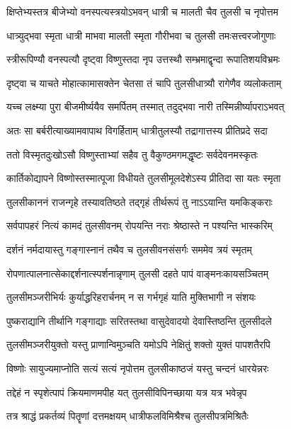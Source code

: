 
\twolineshloka
{क्षिप्तेभ्यस्तत्र बीजेभ्यो वनस्पत्यस्त्रयोऽभवन्}
{धात्री च मालती चैव तुलसी च नृपोत्तम} %

\twolineshloka
{धात्र्युद्भवा स्मृता धात्री माभवा मालती स्मृता}
{गौरीभवा च तुलसी तमःसत्त्वरजोगुणाः} %

\twolineshloka
{स्त्रीरूपिण्यौ वनस्पत्यौ दृष्ट्वा विष्णुस्तदा नृप}
{उत्तस्थौ सम्भ्रमाद्वृन्दा रूपातिशयविभ्रमः} %

\twolineshloka
{दृष्ट्वा च याचते मोहात्कामासक्तेन चेतसा}
{तं चापि तुलसीधात्र्यौ रागेणैव व्यलोकताम्} %

\twolineshloka
{यच्च लक्ष्म्या पुरा बीजमीर्ष्ययैव समर्पितम्}
{तस्मात् तदुद्भवा नारी तस्मिन्नीर्ष्यापराऽभवत्} %

\twolineshloka
{अतः सा बर्बरीत्याख्यामवापाथ विगर्हिताम्}
{धात्रीतुलस्यौ तद्रागात्तस्य प्रीतिप्रदे सदा} %

\twolineshloka
{ततो विस्मृतदुःखोऽसौ विष्णुस्ताभ्यां सहैव तु}
{वैकुण्ठमगमद्धृष्टः सर्वदेवनमस्कृतः} %

\twolineshloka
{कार्तिकोद्यापने विष्णोस्तस्मात्पूजा विधीयते}
{तुलसीमूलदेशेऽस्य प्रीतिदा सा यतः स्मृता} %

\twolineshloka
{तुलसीकाननं राजन्गृहे तस्यावतिष्ठते}
{तद्गृहं तीर्थरूपं तु नाऽऽयान्ति यमकिङ्कराः} %

\twolineshloka
{सर्वपापहरं नित्यं कामदं तुलसीवनम्}
{रोपयन्ति नराः श्रेष्ठास्ते न पश्यन्ति भास्करिम्} %

\twolineshloka
{दर्शनं नर्मदायास्तु गङ्गास्नानं तथैव च}
{तुलसीवनसंसर्गः सममेव त्रयं स्मृतम्} %

\twolineshloka
{रोपणात्पालनात्सेकाद्दर्शनात्स्पर्शनान्नृणाम्}
{तुलसी दहते पापं वाङ्मनःकायसञ्चितम्} %

\twolineshloka
{तुलसीमञ्जरीभिर्यः कुर्याद्धरिहरार्चनम्}
{न स गर्भगृहं याति मुक्तिभागी न संशयः} %

\twolineshloka
{पुष्कराद्यानि तीर्थानि गङ्गाद्याः सरितस्तथा}
{वासुदेवादयो देवास्तिष्ठन्ति तुलसीदले} %

\twolineshloka
{तुलसीमञ्जरीयुक्तो यस्तु प्राणान्विमुञ्चति}
{यमोऽपि नेक्षितुं शक्तो युक्तं पापशतैरपि} %

\twolineshloka
{विष्णोः सायुज्यमाप्नोति सत्यं सत्यं नृपोत्तम}
{तुलसीकाष्ठजं यस्तु चन्दनं धारयेन्नरः} %

\twolineshloka
{तद्देहं न स्पृशेत्पापं क्रियमाणमपीह यत्}
{तुलसीविपिनच्छाया यत्र यत्र भवेन्नृप} %

\twolineshloka
{तत्र श्राद्धं प्रकर्तव्यं पितॄणां दत्तमक्षयम्}
{धात्रीफलविमिश्रैश्च तुलसीपत्रमिश्रितैः} %

